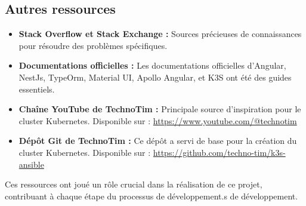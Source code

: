 \subsection{Autres ressources}\label{subsec:autres-ressources}
\begin{itemize}
    \item \textbf{Stack Overflow et Stack Exchange :} Sources précieuses de connaissances pour résoudre des problèmes spécifiques.
    \item \textbf{Documentations officielles :} Les documentations officielles d'Angular, NestJs, TypeOrm, Material UI, Apollo Angular, et K3S ont été des guides essentiels.
    \item \textbf{Chaîne YouTube de TechnoTim :} Principale source d'inspiration pour le cluster Kubernetes.
    Disponible sur : \url{https://www.youtube.com/@technotim}
    \item \textbf{Dépôt Git de TechnoTim :} Ce dépôt a servi de base pour la création du cluster Kubernetes.
    Disponible sur : \url{https://github.com/techno-tim/k3s-ansible}
\end{itemize}

Ces ressources ont joué un rôle crucial dans la réalisation de ce projet, contribuant à chaque étape du processus de développement.s de développement.